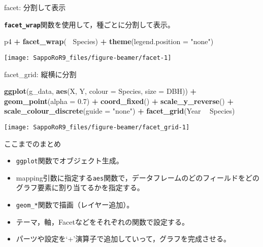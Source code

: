 \documentclass[ignorenonframetext,]{beamer}
\newenvironment{Shaded}{\begin{snugshade}}{\end{snugshade}}
\newcommand{\KeywordTok}[1]{\textcolor[rgb]{0.13,0.29,0.53}{\textbf{#1}}}
\newcommand{\DataTypeTok}[1]{\textcolor[rgb]{0.13,0.29,0.53}{#1}}
\newcommand{\FloatTok}[1]{\textcolor[rgb]{0.00,0.00,0.81}{#1}}
\newcommand{\StringTok}[1]{\textcolor[rgb]{0.31,0.60,0.02}{#1}}
\newcommand{\OperatorTok}[1]{\textcolor[rgb]{0.81,0.36,0.00}{\textbf{#1}}}
\newcommand{\NormalTok}[1]{#1}
\providecommand{\tightlist}{%
  \setlength{\itemsep}{0pt}\setlength{\parskip}{0pt}}
\let\oldShaded\Shaded
\let\endoldShaded\endShaded
\renewenvironment{Shaded}{\footnotesize\oldShaded}{\endoldShaded}
\begin{document}
\begin{frame}[fragile]{facet: 分割して表示}

\textbf{\texttt{facet\_wrap}}関数を使用して，種ごとに分割して表示。

\begin{Shaded}
\begin{Highlighting}[]
\NormalTok{p4 }\OperatorTok{+}\StringTok{ }\KeywordTok{facet_wrap}\NormalTok{(}\OperatorTok{~}\StringTok{ }\NormalTok{Species) }\OperatorTok{+}\StringTok{ }\KeywordTok{theme}\NormalTok{(}\DataTypeTok{legend.position =} \StringTok{"none"}\NormalTok{)}
\end{Highlighting}
\end{Shaded}

\texttt{[image: SappoRoR9\_files/figure-beamer/facet-1]}

\end{frame}

\begin{frame}[fragile]{facet\_grid: 縦横に分割}

\begin{Shaded}
\begin{Highlighting}[]
\KeywordTok{ggplot}\NormalTok{(g_data, }\KeywordTok{aes}\NormalTok{(X, Y, }\DataTypeTok{colour =}\NormalTok{ Species, }\DataTypeTok{size =}\NormalTok{ DBH)) }\OperatorTok{+}
\StringTok{  }\KeywordTok{geom_point}\NormalTok{(}\DataTypeTok{alpha =} \FloatTok{0.7}\NormalTok{) }\OperatorTok{+}\StringTok{ }\KeywordTok{coord_fixed}\NormalTok{() }\OperatorTok{+}\StringTok{ }\KeywordTok{scale_y_reverse}\NormalTok{() }\OperatorTok{+}
\StringTok{  }\KeywordTok{scale_colour_discrete}\NormalTok{(}\DataTypeTok{guide =} \StringTok{"none"}\NormalTok{) }\OperatorTok{+}
\StringTok{  }\KeywordTok{facet_grid}\NormalTok{(Year }\OperatorTok{~}\StringTok{ }\NormalTok{Species)}
\end{Highlighting}
\end{Shaded}

\texttt{[image: SappoRoR9\_files/figure-beamer/facet\_grid-1]}

\end{frame}

\begin{frame}[fragile]{ここまでのまとめ}

\Large

\begin{itemize}
\tightlist
\item
  \texttt{ggplot}関数でオブジェクト生成。
\item
  mapping引数に指定する\texttt{aes}関数で，データフレームのどのフィールドをどのグラフ要素に割り当てるかを指定する。
\item
  \texttt{geom\_*}関数で描画（レイヤー追加）。
\item
  テーマ，軸，Facetなどをそれぞれの関数で設定する。
\item
  パーツや設定を`+'演算子で追加していって，グラフを完成させる。
\end{itemize}

\end{frame}
\end{document}
